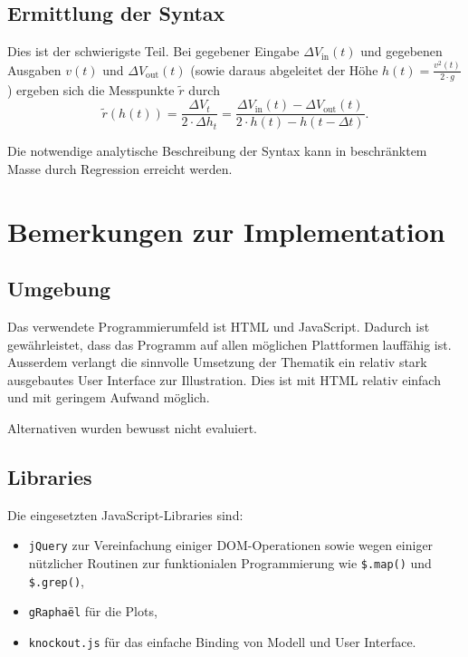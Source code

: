 \documentclass[11pt]{scrreprt} %
\theoremstyle{definition}
\begin{document}
\section{Ermittlung der Syntax}

Dies ist der schwierigste Teil. Bei gegebener Eingabe $\Delta V_\text{in}(t)$ und gegebenen Ausgaben $v(t)$ und $\Delta V_\text{out}(t)$ (sowie daraus abgeleitet der Höhe $h(t) = \frac {v^2(t)}{2\cdot g}$) ergeben sich die Messpunkte $\tilde r$ durch
\[
	\tilde r(h(t)) = \frac {\Delta V_t}{2 \cdot \Delta h_t} = \frac {\Delta V_\text{in}(t)-\Delta V_\text{out}(t)} {2 \cdot h(t) - h(t-\Delta t)}.
\]

Die notwendige analytische Beschreibung der Syntax kann in beschränktem Masse durch Regression erreicht werden.

\chapter{Bemerkungen zur Implementation}

\section{Umgebung}

Das verwendete Programmierumfeld ist HTML und JavaScript. Dadurch ist gewährleistet, dass das Programm auf allen möglichen Plattformen lauffähig ist. Ausserdem verlangt die sinnvolle Umsetzung der Thematik ein relativ stark ausgebautes User Interface zur Illustration. Dies ist mit HTML relativ einfach und mit geringem Aufwand möglich.

Alternativen wurden bewusst nicht evaluiert.

\section{Libraries}

Die eingesetzten JavaScript-Libraries sind:
\begin{itemize}
\item {\tt jQuery} \cite{lib:jquery} zur Vereinfachung einiger DOM-Operationen sowie wegen einiger nützlicher Routinen zur funktionialen Programmierung wie {\tt \$.map()} und {\tt \$.grep()},
\item {\tt gRaphaël} \cite{lib:graphael} für die Plots,
\item {\tt knockout.js} \cite{lib:knockout} für das einfache Binding von Modell und User Interface.
\end{itemize}
\end{document}
